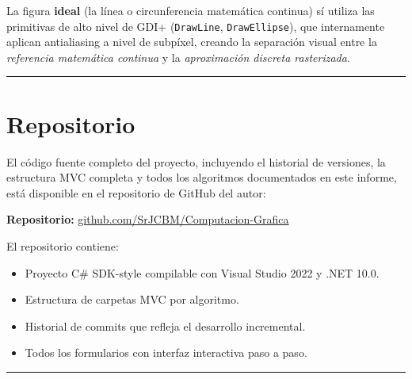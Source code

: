 \documentclass[
  spanish,
  a4paper,
  12pt,
]{article}
\newcommand{\passthrough}[1]{#1}
\providecommand{\tightlist}{%
  \setlength{\itemsep}{0pt}\setlength{\parskip}{0pt}}
\begin{document}
La figura \textbf{ideal} (la línea o circunferencia matemática continua)
sí utiliza las primitivas de alto nivel de GDI+
(\passthrough{\lstinline!DrawLine!},
\passthrough{\lstinline!DrawEllipse!}), que internamente aplican
antialiasing a nivel de subpíxel, creando la separación visual entre la
\emph{referencia matemática continua} y la \emph{aproximación discreta
rasterizada}.

\begin{center}\rule{0.5\linewidth}{0.5pt}\end{center}

\section{Repositorio}\label{repositorio}

El código fuente completo del proyecto, incluyendo el historial de
versiones, la estructura MVC completa y todos los algoritmos
documentados en este informe, está disponible en el repositorio de
GitHub del autor:

\textbf{Repositorio:}
\href{https://github.com/SrJCBM/Computacion-Grafica}{github.com/SrJCBM/Computacion-Grafica}

El repositorio contiene:

\begin{itemize}
\tightlist
\item Proyecto C\# SDK-style compilable con Visual Studio 2022 y .NET 10.0.
\item Estructura de carpetas MVC por algoritmo.
\item Historial de commits que refleja el desarrollo incremental.
\item Todos los formularios con interfaz interactiva paso a paso.
\end{itemize}

\begin{center}\rule{0.5\linewidth}{0.5pt}\end{center}
\end{document}
